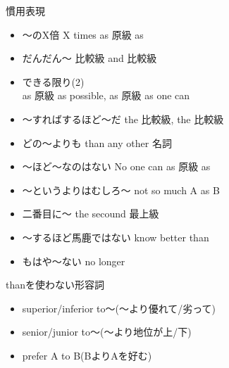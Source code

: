\documentclass[10pt]{jsarticle}
\newcommand{\answer}[2]{{\color{orange}#2}}
\newcommand{\answer}[2]{\vspace{#1mm}}
\begin{document}
\begin{itembox}[l]{慣用表現}
	\begin{multicols}{2}
		\begin{itemize}
			\item 〜のX倍  \answer{5}{X times as 原級 as}
			\item だんだん〜  \answer{5}{比較級 and 比較級}
			\item できる限り(2)  \answer{5}{\\as 原級 as possible, as 原級 as one can}
			\item 〜すればするほど〜だ  \answer{5}{the 比較級, the 比較級}
			\item どの〜よりも  \answer{5}{than any other 名詞}
			\item 〜ほど〜なのはない  \answer{5}{No one can as 原級 as ~}
			\item 〜というよりはむしろ〜  \answer{5}{not so much A as B}
			\item 二番目に〜  \answer{5}{the secound 最上級}
			\item 〜するほど馬鹿ではない \answer{5}{know better than}
			\item もはや〜ない \answer{5}{no longer}
		\end{itemize}
	\end{multicols}
\end{itembox}

\begin{itembox}[l]{thanを使わない形容詞}
	\answer{10}{
		\begin{itemize}
			\item superior/inferior to〜(〜より優れて/劣って)
			\item senior/junior to〜(〜より地位が上/下)
			\item prefer A to B(BよりAを好む)
		\end{itemize}
	}
\end{itembox}
\end{document}
